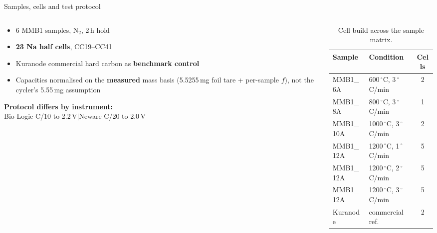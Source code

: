 \begin{frame}{Samples, cells and test protocol}
  \begin{columns}[T]
    \begin{column}{0.54\textwidth}
      \begin{itemize}
        \item 6 MMB1 samples, N\(_2\), 2\,h hold
        \item \textbf{23 Na half cells}, CC19--CC41
        \item Kuranode commercial hard carbon as
              \textbf{benchmark control}
        \item Capacities normalised on the
              \textbf{measured} mass basis
              (5.5255\,mg foil tare + per-sample \(f\)),
              not the cycler's 5.55\,mg assumption
      \end{itemize}
      \vspace{0.3em}
      {\footnotesize
      \textbf{Protocol differs by instrument:}\\
      Bio-Logic C/10 to 2.2\,V\quad$\vert$\quad Neware C/20 to 2.0\,V}
    \end{column}
    \begin{column}{0.43\textwidth}
      \begin{table}
        \centering
        \footnotesize
        \begin{tabular}{@{}llc@{}}
          \toprule
          \textbf{Sample} & \textbf{Condition} & \textbf{Cells} \\
          \midrule
          MMB1\_6A  & 600\,\({^\circ}\)C, 3\,\({^\circ}\)C/min  & 2 \\
          MMB1\_8A  & 800\,\({^\circ}\)C, 3\,\({^\circ}\)C/min  & 1 \\
          MMB1\_10A & 1000\,\({^\circ}\)C, 3\,\({^\circ}\)C/min & 2 \\
          MMB1\_12A & 1200\,\({^\circ}\)C, 1\,\({^\circ}\)C/min & 5 \\
          MMB1\_12A & 1200\,\({^\circ}\)C, 2\,\({^\circ}\)C/min & 5 \\
          MMB1\_12A & 1200\,\({^\circ}\)C, 3\,\({^\circ}\)C/min & 5 \\
          Kuranode  & commercial ref.            & 2 \\
          \bottomrule
        \end{tabular}
        \caption{Cell build across the sample matrix.}\label{tab:matrix}
      \end{table}

\end{column}
\end{columns}
\end{frame}
